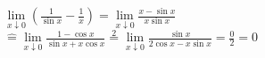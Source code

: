 \documentclass[18pt,a4paper]{article}
\begin{document}
\qquad
$
\underset{x \downarrow 0} {\lim} \left( \frac{1}{\sin x} - \frac{1}{x} \right) = \underset{x \downarrow 0} {\lim} \frac{x - \sin x}{x \sin x} $ \\ $
\mathrel{\hat=} \underset{x \downarrow 0} {\lim} \frac {1 - \cos x}{\sin x + x \cos x} \overset {2} {=} \underset {x \downarrow 0} {\lim} \frac{\sin x}{ 2 \cos x - x \sin x} = \frac{0}{2} = 0 $ \\ 
\end{document}
